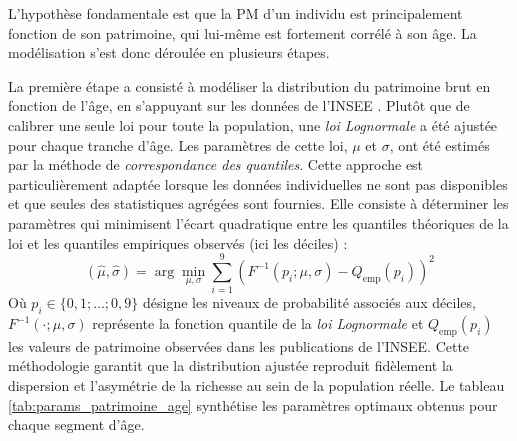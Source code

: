 L'hypothèse fondamentale est que la PM d'un individu est principalement fonction de son patrimoine, qui lui-même est fortement corrélé à son âge. La modélisation s'est donc déroulée en plusieurs étapes.


La première étape a consisté à modéliser la distribution du patrimoine brut en fonction de l'âge, en s'appuyant sur les données de l'INSEE \cite{insee_patrimoine_age}. Plutôt que de calibrer une seule loi pour toute la population, une \textit{loi Lognormale} a été ajustée pour chaque tranche d'âge. Les paramètres de cette loi, $\mu$ et $\sigma$, ont été estimés par la méthode de \textit{correspondance des quantiles}. Cette approche est particulièrement adaptée lorsque les données individuelles ne sont pas disponibles et que seules des statistiques agrégées sont fournies. Elle consiste à déterminer les paramètres qui minimisent l'écart quadratique entre les quantiles théoriques de la loi et les quantiles empiriques observés (ici les déciles) :
\begin{equation}
    (\hat{\mu}, \hat{\sigma}) = \arg\min_{\mu, \sigma} \sum_{i=1}^{9} \left( F^{-1}(p_i; \mu, \sigma) - Q_{\text{emp}}(p_i) \right)^2
\end{equation}
Où $p_i \in \{0{,}1; \dots; 0{,}9\}$ désigne les niveaux de probabilité associés aux déciles, $F^{-1}(\cdot; \mu, \sigma)$ représente la fonction quantile de la \textit{loi Lognormale} et $Q_{\text{emp}}(p_i)$ les valeurs de patrimoine observées dans les publications de l'INSEE. Cette méthodologie garantit que la distribution ajustée reproduit fidèlement la dispersion et l'asymétrie de la richesse au sein de la population réelle. Le tableau \ref{tab:params_patrimoine_age} synthétise les paramètres optimaux obtenus pour chaque segment d'âge.

\begin{table}[H]
\centering
{}
\caption{Paramètres de la loi Lognormale du patrimoine brut, calibrés par tranche d'âge}
\label{tab:params_patrimoine_age}
\end{table}

